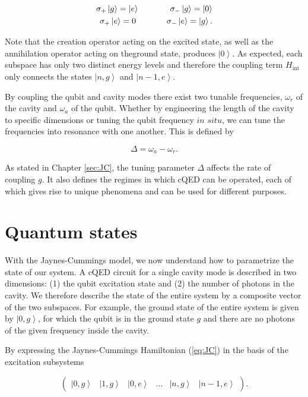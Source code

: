 \documentclass[11 pt, oneside]{book} %
\newcommand{\ket}[1]{\left| #1 \right>} %
\begin{document}
\begin{eqnarray}
\sigma_+\ket{g} = \ket{e} \hspace{1.3cm} \sigma_-\ket{g} = \ket{0} \\
\sigma_+\ket{e} = 0\hspace{1.3cm} \sigma_-\ket{e} = \ket{g}. \nonumber
\end{eqnarray}

Note that the creation operator acting on the excited state, as well as the annihilation operator acting on theground state, produces $\ket{0}$. As expected, each subspace has only two distinct energy levels and therefore the coupling term $H_{\mathrm{int}}$ only connects the states $\ket{n,g}$ and $\ket{n-1,e}$.

By coupling the qubit and cavity modes there exist two tunable frequencies, $\omega_r$ of the cavity and $\omega_a$ of the qubit. Whether by engineering the length of the cavity to specific dimensions or tuning the qubit frequency $in$ $situ$, we can tune the frequencies into resonance with one another. This is defined by

\begin{equation}
\Delta = \omega_a - \omega_r.
\end{equation}

As stated in Chapter \ref{sec:JC}, the tuning parameter $\Delta$ affects the rate of coupling $g$. It also defines the regimes in which cQED can be operated, each of which gives rise to unique phenomena and can be used for different purposes. 

\section{Quantum states}
With the Jaynes-Cummings model, we now understand how to parametrize the state of our system. A cQED circuit for a single cavity mode is described in two dimensions: (1) the qubit excitation state and (2) the number of photons in the cavity. We therefore describe the state of the entire system by a composite vector of the two subspaces. For example, the ground state of the entire system is given by $\ket{0,g}$, for which the qubit is in the ground state $g$ and there are no photons of the given frequency inside the cavity. 

By expressing the Jaynes-Cummings Hamiltonian (\ref{eq:JC})  in the basis of the excitation subsystems

\begin{equation}
\left(\begin{array}{cccccc} \ket{0,g} & \ket{1,g} & \ket{0,e} & ... & \ket{n, g} & \ket{n-1,e}
\end{array}\right).
\end{equation}
\end{document}
